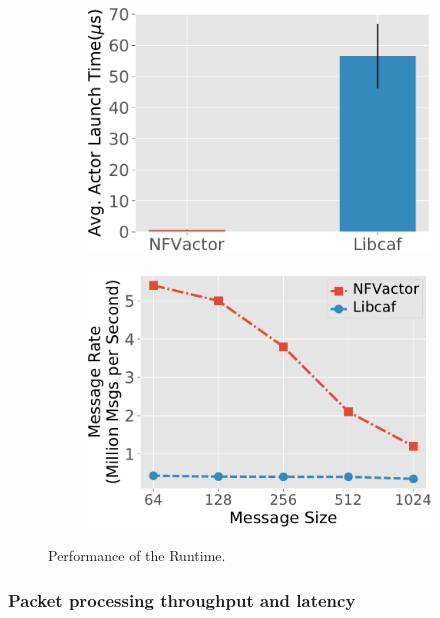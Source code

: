 \begin{figure}[!h]
\begin{subfigure}[t]{0.49\linewidth}
    \centering
    \includegraphics[width=\columnwidth]{chap-nfvactor/exp-figure/micro_launch_time.pdf}
    \caption{}\label{fig:micro_launch_time}
  \end{subfigure}\hfill
  \begin{subfigure}[t]{0.49\linewidth}
    \centering
    \includegraphics[width=\columnwidth]{chap-nfvactor/exp-figure/micro_mp.pdf}
    \caption{}\label{fig:micro_mp}
  \end{subfigure}
\caption{Performance of the Runtime.}
\end{figure}

\subsubsection{Packet processing throughput and latency}
\label{sec:packet-processing-tl}

